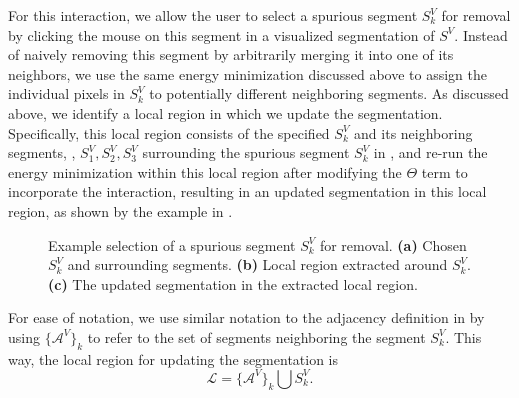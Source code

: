 \documentclass[]{spie}  %
\begin{document}
For this interaction, we allow the user to select a spurious segment
$S^V_k$ for removal by clicking the mouse on this segment in a
visualized segmentation of $S^V$.  Instead of naively removing this
segment by arbitrarily merging it into one of its neighbors, we use
the same energy minimization discussed above to assign the individual
pixels in $S^V_k$ to potentially different neighboring segments.  As
discussed above, we identify a local region in which we update the
segmentation.  Specifically, this local region consists of the
specified $S^V_k$ and its neighboring segments, \eg, $S^V_1, S^V_2,
S^V_3$ surrounding the spurious segment $S^V_k$ in
, and re-run the energy minimization within this
local region after modifying the $\Theta$ term to incorporate the
interaction, resulting in an updated segmentation in this local
region, as shown by the example in .
\begin{figure}[htbp]
\centering
{}
\hspace{0.1em}
\hspace{0.1em}
\caption{Example selection of a spurious segment $S^V_k$ for removal.
  \textbf{(a)} Chosen $S^V_k$ and surrounding segments.  \textbf{(b)}
  Local region extracted around $S^V_k$.  \textbf{(c)} The updated
  segmentation in the extracted local region.}
\label{fig:removal-ex}
\end{figure}

For ease of notation, we use similar notation to the adjacency
definition in  by using $\{\mathcal{A}^V\}_k$ to refer to the
set of segments neighboring the segment $S^V_k$.  This way, the local
region for updating the segmentation is
\begin{equation}
  \mathcal{L} = \{\mathcal{A}^V\}_k \bigcup S^V_k .
\end{equation}
\end{document}
